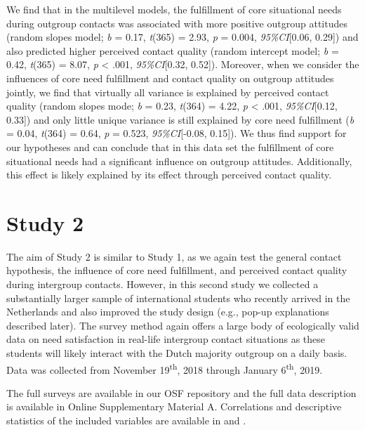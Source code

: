We find that in the multilevel models, the fulfillment of core
situational needs during outgroup contacts was associated with more
positive outgroup attitudes (random slopes model; \textit{b} = 0.17,
\textit{t}(365) = 2.93, \textit{p} = 0.004, \textit{95\%CI}{[}0.06,
0.29{]}) and also predicted higher perceived contact quality (random
intercept model; \textit{b} = 0.42, \textit{t}(365) = 8.07, \textit{p}
\textless{} .001, \textit{95\%CI}{[}0.32, 0.52{]}). Moreover, when we
consider the influences of core need fulfillment and contact quality on
outgroup attitudes jointly, we find that virtually all variance is
explained by perceived contact quality (random slopes mode; \textit{b} =
0.23, \textit{t}(364) = 4.22, \textit{p} \textless{} .001,
\textit{95\%CI}{[}0.12, 0.33{]}) and only little unique variance is
still explained by core need fulfillment (\textit{b} = 0.04,
\textit{t}(364) = 0.64, \textit{p} = 0.523, \textit{95\%CI}{[}-0.08,
0.15{]}). We thus find support for our hypotheses and can conclude that
in this data set the fulfillment of core situational needs had a
significant influence on outgroup attitudes. Additionally, this effect
is likely explained by its effect through perceived contact quality.

\section{Study 2}

The aim of Study 2 is similar to Study 1, as we again test the general
contact hypothesis, the influence of core need fulfillment, and
perceived contact quality during intergroup contacts. However, in this
second study we collected a substantially larger sample of international
students who recently arrived in the Netherlands and also improved the
study design (e.g., pop-up explanations described later). The survey
method again offers a large body of ecologically valid data on need
satisfaction in real-life intergroup contact situations as these
students will likely interact with the Dutch majority outgroup on a
daily basis. Data was collected from November 19\textsuperscript{th},
2018 through January 6\textsuperscript{th}, 2019.

The full surveys are available in our OSF repository
\citep{KreienkampMasked2022a} and the full data description is available
in Online Supplementary Material A. Correlations and descriptive
statistics of the included variables are available in
 and .


